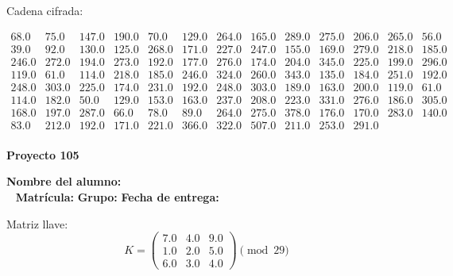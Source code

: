 \documentclass[12pt]{article}
\begin{document}
Cadena cifrada:
\begin{center}
$\begin{array}{lllllllllllll}
68.0 & 75.0 & 147.0 & 190.0 & 70.0 & 129.0 & 264.0 & 165.0 & 289.0 & 275.0 & 206.0 & 265.0 & 56.0\\
39.0 & 92.0 & 130.0 & 125.0 & 268.0 & 171.0 & 227.0 & 247.0 & 155.0 & 169.0 & 279.0 & 218.0 & 185.0\\
246.0 & 272.0 & 194.0 & 273.0 & 192.0 & 177.0 & 276.0 & 174.0 & 204.0 & 345.0 & 225.0 & 199.0 & 296.0\\
119.0 & 61.0 & 114.0 & 218.0 & 185.0 & 246.0 & 324.0 & 260.0 & 343.0 & 135.0 & 184.0 & 251.0 & 192.0\\
248.0 & 303.0 & 225.0 & 174.0 & 231.0 & 192.0 & 248.0 & 303.0 & 189.0 & 163.0 & 200.0 & 119.0 & 61.0\\
114.0 & 182.0 & 50.0 & 129.0 & 153.0 & 163.0 & 237.0 & 208.0 & 223.0 & 331.0 & 276.0 & 186.0 & 305.0\\
168.0 & 197.0 & 287.0 & 66.0 & 78.0 & 89.0 & 264.0 & 275.0 & 378.0 & 176.0 & 170.0 & 283.0 & 140.0\\
83.0 & 212.0 & 192.0 & 171.0 & 221.0 & 366.0 & 322.0 & 507.0 & 211.0 & 253.0 & 291.0\\
\end{array}$
\end{center}

\newpage


\textbf{Proyecto 105}

\textbf{Nombre del alumno:} \underline{\hspace{13cm}}\\\
\vspace{1cm}
\textbf{Matrícula:} \underline{\hspace{4cm}} \hspace{1cm}
\textbf{Grupo:} \underline{\hspace{2cm}}
\textbf{Fecha de entrega:} \underline{\hspace{2cm}}

\medskip

Matriz llave:
\[
K = \begin{pmatrix}
7.0 & 4.0 & 9.0\\
1.0 & 2.0 & 5.0\\
6.0 & 3.0 & 4.0
\end{pmatrix} \pmod{29}
\]
\end{document}
